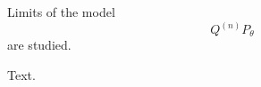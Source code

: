 \documentclass{ucthesis}
\begin{document}
\begin{frontmatter}
Limits of the model $$Q^{(n)}P_\theta$$ are studied.
\end{frontmatter}
Text.
\end{document}

